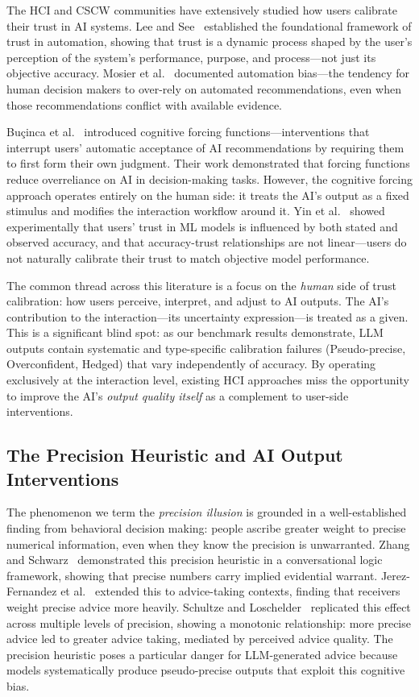 \documentclass[manuscript, review, anonymous]{acmart}
\begin{document}
The HCI and CSCW communities have extensively studied how users calibrate their trust in AI systems. Lee and See~\cite{lee2004trust} established the foundational framework of trust in automation, showing that trust is a dynamic process shaped by the user's perception of the system's performance, purpose, and process---not just its objective accuracy. Mosier et al.~\cite{mosier1998automation} documented automation bias---the tendency for human decision makers to over-rely on automated recommendations, even when those recommendations conflict with available evidence.

Bu\c{c}inca et al.~\cite{bucinca2021trust} introduced cognitive forcing functions---interventions that interrupt users' automatic acceptance of AI recommendations by requiring them to first form their own judgment. Their work demonstrated that forcing functions reduce overreliance on AI in decision-making tasks. However, the cognitive forcing approach operates entirely on the human side: it treats the AI's output as a fixed stimulus and modifies the interaction workflow around it. Yin et al.~\cite{yin2019accuracy} showed experimentally that users' trust in ML models is influenced by both stated and observed accuracy, and that accuracy-trust relationships are not linear---users do not naturally calibrate their trust to match objective model performance.

The common thread across this literature is a focus on the \emph{human} side of trust calibration: how users perceive, interpret, and adjust to AI outputs. The AI's contribution to the interaction---its uncertainty expression---is treated as a given. This is a significant blind spot: as our benchmark results demonstrate, LLM outputs contain systematic and type-specific calibration failures (Pseudo-precise, Overconfident, Hedged) that vary independently of accuracy. By operating exclusively at the interaction level, existing HCI approaches miss the opportunity to improve the AI's \emph{output quality itself} as a complement to user-side interventions.

\subsection{The Precision Heuristic and AI Output Interventions}

The phenomenon we term the \emph{precision illusion} is grounded in a well-established finding from behavioral decision making: people ascribe greater weight to precise numerical information, even when they know the precision is unwarranted. Zhang and Schwarz~\cite{zhang2012precision} demonstrated this precision heuristic in a conversational logic framework, showing that precise numbers carry implied evidential warrant. Jerez-Fernandez et al.~\cite{jerez2014precision} extended this to advice-taking contexts, finding that receivers weight precise advice more heavily. Schultze and Loschelder~\cite{schultze2020numeric} replicated this effect across multiple levels of precision, showing a monotonic relationship: more precise advice led to greater advice taking, mediated by perceived advice quality. The precision heuristic poses a particular danger for LLM-generated advice because models systematically produce pseudo-precise outputs that exploit this cognitive bias.
\end{document}
